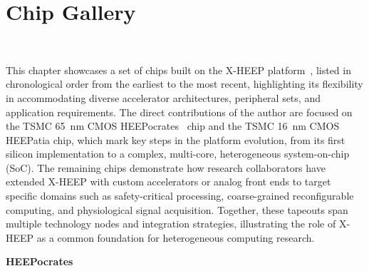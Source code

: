 \appendix
\chapter*{Chip Gallery}~\label{appendix:chip_gallery}
\renewcommand{\chaptermark}[1]{\markboth{Appendix}{}} 

This chapter showcases a set of chips built on the \mbox{X-HEEP} platform~\cite{x-heep}, listed in chronological order from the earliest to the most recent, highlighting its flexibility in accommodating diverse accelerator architectures, peripheral sets, and application requirements. The direct contributions of the author are focused on the TSMC \SI{65}{\nano\meter} CMOS \mbox{HEEPocrates}~\cite{heepocrates} chip and the TSMC \SI{16}{\nano\meter} CMOS \mbox{HEEPatia} chip, which mark key steps in the platform evolution, from its first silicon implementation to a complex, multi-core, heterogeneous system-on-chip (SoC). The remaining chips demonstrate how research collaborators have extended \mbox{X-HEEP} with custom accelerators or analog front ends to target specific domains such as safety-critical processing, coarse-grained reconfigurable computing, and physiological signal acquisition. Together, these tapeouts span multiple technology nodes and integration strategies, illustrating the role of \mbox{X-HEEP} as a common foundation for heterogeneous computing research.

\clearpage

\begin{center}
\LARGE \bfseries HEEPocrates
\end{center}

